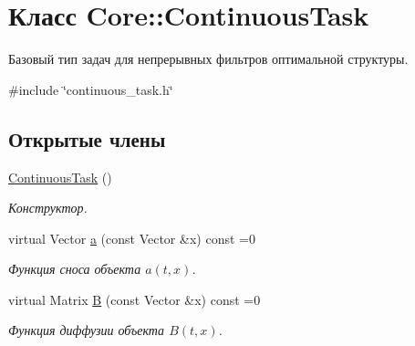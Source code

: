 \hypertarget{class_core_1_1_continuous_task}{}\section{Класс Core\+:\+:Continuous\+Task}
\label{class_core_1_1_continuous_task}


Базовый тип задач для непрерывных фильтров оптимальной структуры.  




{\ttfamily \#include \char`\"{}continuous\+\_\+task.\+h\char`\"{}}

\subsection*{Открытые члены}
\begin{DoxyCompactItemize}
\item 
\hypertarget{class_core_1_1_continuous_task_ab2c8106695e42db14d92364d1a310a6a}{}\label{class_core_1_1_continuous_task_ab2c8106695e42db14d92364d1a310a6a} 
\hyperlink{class_core_1_1_continuous_task_ab2c8106695e42db14d92364d1a310a6a}{Continuous\+Task} ()
\begin{DoxyCompactList}\small\item\em Конструктор. \end{DoxyCompactList}\item 
\hypertarget{class_core_1_1_continuous_task_a6117abb702d06b52eec1dc1951bab874}{}\label{class_core_1_1_continuous_task_a6117abb702d06b52eec1dc1951bab874} 
virtual Vector \hyperlink{class_core_1_1_continuous_task_a6117abb702d06b52eec1dc1951bab874}{a} (const Vector \&x) const =0
\begin{DoxyCompactList}\small\item\em Функция сноса объекта $a(t,x)$. \end{DoxyCompactList}\item 
\hypertarget{class_core_1_1_continuous_task_a1a1af322efd852451692b7a2e39ec19e}{}\label{class_core_1_1_continuous_task_a1a1af322efd852451692b7a2e39ec19e} 
virtual Matrix \hyperlink{class_core_1_1_continuous_task_a1a1af322efd852451692b7a2e39ec19e}{B} (const Vector \&x) const =0
\begin{DoxyCompactList}\small\item\em Функция диффузии объекта $B(t,x)$. \end{DoxyCompactList}\item 
\hypertarget{class_core_1_1_continuous_task_a623929970ce6d99f97b83b940003d004}{}\label{class_core_1_1_continuous_task_a623929970ce6d99f97b83b940003d004} 

\end{DoxyCompactItemize}

